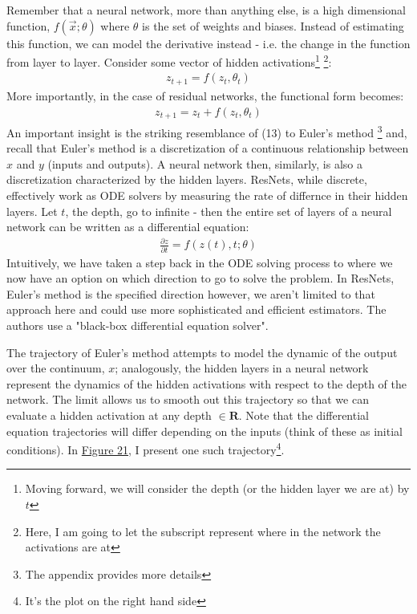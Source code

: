 \documentclass{article}
\begin{document}
\noindent Remember that a neural network, more than anything else, is a high dimensional function, $f(\vec{x}; \theta)$ where $\theta$ is the set of weights and biases. Instead of estimating this function, we can model the derivative instead - i.e. the change in the function from layer to layer. Consider some vector \cite{underODE2} of hidden activations\footnote{Moving forward, we will consider the depth (or the hidden layer we are at) by $t$} \footnote{Here, I am going to let the subscript represent where in the network the activations are at}:
\begin{align}
    z_{t + 1} = f(z_{t}, \theta_{t})
\end{align}
\noindent More importantly, in the case of residual networks, the functional form becomes:
\begin{align}
    z_{t + 1} = z_{t} + f(z_{t}, \theta_{t})
\end{align}
\noindent An important insight is the striking resemblance of (13) to Euler's method \footnote{The appendix provides more details} and, recall that Euler's method is a discretization of a continuous relationship between $x$ and $y$ (inputs and outputs). A neural network then, similarly, is also a discretization characterized by the hidden layers. ResNets, while discrete, effectively work as ODE solvers by measuring the rate of differnce in their hidden layers. Let $t$, the depth, go to infinite - then the entire set of layers of a neural network can be written as a differential equation:
\begin{align}
    \frac{\partial z}{\partial t} = f(z(t), t; \theta)
\end{align}
\noindent Intuitively, we have taken a step back in the ODE solving process to where we now have an option on which direction to go to solve the problem. In ResNets, Euler's method is the specified direction however, we aren't limited to that approach here and could use more sophisticated and efficient estimators. The authors use a "black-box differential equation solver".

\noindent The trajectory of Euler's method attempts to model the dynamic of the output over the continuum, $x$; analogously, the hidden layers in a neural network represent the dynamics of the hidden activations with respect to the depth of the network. The limit allows us to smooth out this trajectory so that we can evaluate a hidden activation at any depth $\in \mathbf{R}$. Note that the differential equation trajectories will differ depending on the inputs (think of these as initial conditions). In \hyperref[fig:comp_plot]{Figure 21}, I present one such trajectory\footnote{It's the plot on the right hand side}.
\end{document}
